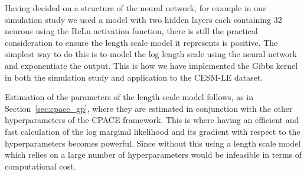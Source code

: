 Having decided on a structure of the neural network, for example in our simulation study we used a model with two hidden layers each containing $32$ neurons using the ReLu activation function, there is still the practical consideration to ensure the length scale model it represents is positive.
The simplest way to do this is to model the log length scale using the neural network and exponentiate the output.
This is how we have implemented the Gibbs kernel in both the simulation study and application to the CESM-LE dataset. 

Estimation of the parameters of the length scale model follows, as in Section~\ref{sec:cpace_gp}, where they are estimated in conjunction with the other hyperparameters of the CPACE framework.
This is where having an efficient and fast calculation of the log marginal likelihood and its gradient with respect to the hyperparameters becomes powerful.
Since without this using a length scale model which relies on a large number of hyperparameters would be infeasible in terms of computational cost.

